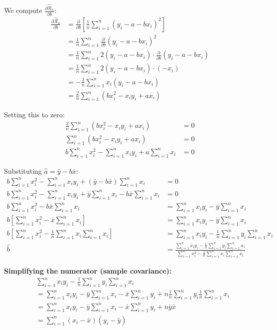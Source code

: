 \documentclass[main.tex]{subfiles}
\begin{document}
We compute $\frac{\partial \hat{\mathcal{R}}_n}{\partial b}$:
\begin{align}
\frac{\partial \hat{\mathcal{R}}_n}{\partial b} &= \frac{\partial}{\partial b} \left[ \frac{1}{n} \sum_{i=1}^{n} (y_i - a - bx_i)^2 \right] \\[8pt]
&= \frac{1}{n} \sum_{i=1}^{n} \frac{\partial}{\partial b} (y_i - a - bx_i)^2 \\[8pt]
&= \frac{1}{n} \sum_{i=1}^{n} 2(y_i - a - bx_i) \cdot \frac{\partial}{\partial b}(y_i - a - bx_i) \\[8pt]
&= \frac{1}{n} \sum_{i=1}^{n} 2(y_i - a - bx_i) \cdot (-x_i) \\[8pt]
&= -\frac{2}{n} \sum_{i=1}^{n} x_i(y_i - a - bx_i) \\[8pt]
&= \frac{2}{n} \sum_{i=1}^{n} (bx_i^2 - x_iy_i + ax_i)
\end{align}

Setting this to zero:
\begin{align}
\frac{2}{n} \sum_{i=1}^{n} (bx_i^2 - x_iy_i + ax_i) &= 0 \\[8pt]
\sum_{i=1}^{n} (bx_i^2 - x_iy_i + ax_i) &= 0 \\[8pt]
b\sum_{i=1}^{n} x_i^2 - \sum_{i=1}^{n} x_iy_i + a\sum_{i=1}^{n} x_i &= 0
\end{align}

Substituting $\hat{a} = \bar{y} - b\bar{x}$:
\begin{align}
b\sum_{i=1}^{n} x_i^2 - \sum_{i=1}^{n} x_iy_i + (\bar{y} - b\bar{x})\sum_{i=1}^{n} x_i &= 0 \\[8pt]
b\sum_{i=1}^{n} x_i^2 - \sum_{i=1}^{n} x_iy_i + \bar{y}\sum_{i=1}^{n} x_i - b\bar{x}\sum_{i=1}^{n} x_i &= 0 \\[8pt]
b\sum_{i=1}^{n} x_i^2 - b\bar{x}\sum_{i=1}^{n} x_i &= \sum_{i=1}^{n} x_iy_i - \bar{y}\sum_{i=1}^{n} x_i \\[8pt]
b\left[\sum_{i=1}^{n} x_i^2 - \bar{x}\sum_{i=1}^{n} x_i\right] &= \sum_{i=1}^{n} x_iy_i - \bar{y}\sum_{i=1}^{n} x_i \\[8pt]
b\left[\sum_{i=1}^{n} x_i^2 - \frac{1}{n}\sum_{i=1}^{n} x_i\sum_{i=1}^{n} x_i\right] &= \sum_{i=1}^{n} x_iy_i - \frac{1}{n}\sum_{i=1}^{n} y_i\sum_{i=1}^{n} x_i \\[8pt]
\hat{b} &= \frac{\displaystyle\sum_{i=1}^{n} x_iy_i - \frac{1}{n}\sum_{i=1}^{n} y_i\sum_{i=1}^{n} x_i}{\displaystyle\sum_{i=1}^{n} x_i^2 - \frac{1}{n}\sum_{i=1}^{n} x_i\sum_{i=1}^{n} x_i}
\end{align}

\textbf{Simplifying the numerator (sample covariance):}
\begin{align}
&\sum_{i=1}^{n} x_iy_i - \frac{1}{n}\sum_{i=1}^{n} y_i\sum_{i=1}^{n} x_i \\[8pt]
&= \sum_{i=1}^{n} x_iy_i - \bar{y}\sum_{i=1}^{n} x_i - \bar{x}\sum_{i=1}^{n} y_i + n\frac{1}{n}\sum_{i=1}^{n} y_i\frac{1}{n}\sum_{i=1}^{n} x_i \\[8pt]
&= \sum_{i=1}^{n} x_iy_i - \bar{y}\sum_{i=1}^{n} x_i - \bar{x}\sum_{i=1}^{n} y_i + n\bar{y}\bar{x} \\[8pt]
&= \sum_{i=1}^{n} (x_i - \bar{x})(y_i - \bar{y})
\end{align}
\end{document}
